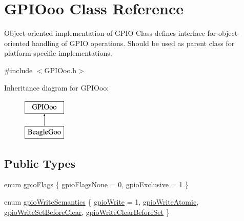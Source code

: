 \hypertarget{class_g_p_i_ooo}{\section{G\-P\-I\-Ooo Class Reference}
\label{class_g_p_i_ooo}
}


Object-\/oriented implementation of G\-P\-I\-O Class defines interface for object-\/oriented handling of G\-P\-I\-O operations. Should be used as parent class for platform-\/specific implementations.  




{\ttfamily \#include $<$G\-P\-I\-Ooo.\-h$>$}

Inheritance diagram for G\-P\-I\-Ooo\-:\begin{figure}[H]
\begin{center}
\leavevmode
\includegraphics[height=2.000000cm]{class_g_p_i_ooo}
\end{center}
\end{figure}
\subsection*{Public Types}
\begin{DoxyCompactItemize}
\item 
enum \hyperlink{class_g_p_i_ooo_a63b72558d40ed7f3ccc0c6f11d1e3b10}{gpio\-Flags} \{ \hyperlink{class_g_p_i_ooo_a63b72558d40ed7f3ccc0c6f11d1e3b10aa64ecca268265aa77389ee957e01fd63}{gpio\-Flags\-None} =  0, 
\hyperlink{class_g_p_i_ooo_a63b72558d40ed7f3ccc0c6f11d1e3b10a42607c5a4f579963b6426f81d2266c62}{gpio\-Exclusive} =  1
 \}
\item 
enum \hyperlink{class_g_p_i_ooo_ad4b133662b68989435bcd422feb0fc03}{gpio\-Write\-Semantics} \{ \hyperlink{class_g_p_i_ooo_ad4b133662b68989435bcd422feb0fc03a21aadd48a3896150795cd7fde8c93969}{gpio\-Write} =  1, 
\hyperlink{class_g_p_i_ooo_ad4b133662b68989435bcd422feb0fc03a359f92e59dfc786c8eb730a95179fd1b}{gpio\-Write\-Atomic}, 
\hyperlink{class_g_p_i_ooo_ad4b133662b68989435bcd422feb0fc03a551b9df4fca015828bfdfbce0e4e9c31}{gpio\-Write\-Set\-Before\-Clear}, 
\hyperlink{class_g_p_i_ooo_ad4b133662b68989435bcd422feb0fc03a4b8a43356457a0d5e5994ab8f1341a7f}{gpio\-Write\-Clear\-Before\-Set}
 \}
\end{DoxyCompactItemize}
